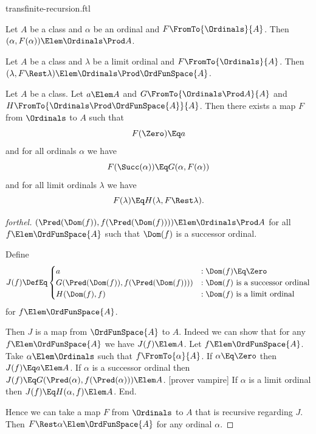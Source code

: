 \documentclass{stex}
\begin{document}
\begin{smodule}{transfinite-recursion.ftl}
\begin{lemma}[forthel]
  Let $A$ be a class and $\alpha$ be an ordinal and $F \FromTo{\Ordinals}{A}$.
  Then $(\alpha, F(\alpha)) \Elem \Ordinals \Prod A$.
\end{lemma}

\begin{lemma}[forthel]
  Let $A$ be a class and $\lambda$ be a limit ordinal and $F \FromTo{\Ordinals}{A}$.
  Then $(\lambda, F \Rest \lambda) \Elem \Ordinals \Prod \OrdFunSpace{A}$.
\end{lemma}

\begin{corollary}[forthel]
  Let $A$ be a class.
  Let $a \Elem A$ and $G \FromTo{\Ordinals \Prod A}{A}$ and\linebreak $H \FromTo{\Ordinals \Prod \OrdFunSpace{A}}{A}$.
  Then there exists a map $F$ from $\Ordinals$ to $A$ such that
  \[ F(\Zero) \Eq a \]
  and for all ordinals $\alpha$ we have
  \[ F(\Succ(\alpha)) \Eq G(\alpha, F(\alpha)) \]
  and for all limit ordinals $\lambda$ we have
  \[ F(\lambda) \Eq H(\lambda, F \Rest \lambda). \]
\end{corollary}
\begin{proof}[forthel]
  $(\Pred(\Dom(f)), f(\Pred(\Dom(f)))) \Elem \Ordinals \Prod A$ for all $f \Elem \OrdFunSpace{A}$ such that $\Dom(f)$ is a successor ordinal.

  Define  \[ J(f) \DefEq
    \begin{cases}
      a
      & : \Dom(f) \Eq \Zero
      \\
      G(\Pred(\Dom(f)), f(\Pred(\Dom(f))))
      & : \text{$\Dom(f)$ is a successor ordinal}
      \\
      H(\Dom(f), f)
      & : \text{$\Dom(f)$ is a limit ordinal}
    \end{cases} \]
  for $f \Elem \OrdFunSpace{A}$.

  Then $J$ is a map from $\OrdFunSpace{A}$ to $A$.
  Indeed we can show that for any $f \Elem \OrdFunSpace{A}$ we have $J(f) \Elem A$.
    Let $f \Elem \OrdFunSpace{A}$.
    Take $\alpha \Elem \Ordinals$ such that $f \FromTo{\alpha}{A}$.
    If $\alpha \Eq \Zero$ then $J(f) \Eq a \Elem A$.
    If $\alpha$ is a successor ordinal then $J(f) \Eq\linebreak G(\Pred(\alpha), f(\Pred(\alpha))) \Elem A$.
    [prover vampire]
    If $\alpha$ is a limit ordinal then $J(f) \Eq H(\alpha, f) \Elem A$.
  End.

  Hence we can take a map $F$ from $\Ordinals$ to $A$ that is recursive regarding $J$.
  Then $F \Rest \alpha \Elem \OrdFunSpace{A}$ for any ordinal $\alpha$.


\end{proof}
\end{smodule}
\end{document}
